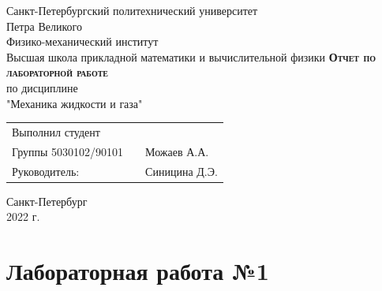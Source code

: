 \documentclass[12pt, a4paper]{article}
\begin{document}
\begin{titlepage}
\begin{center}

\large
Санкт-Петербургский политехнический университет\\Петра Великого\\
\vspace{0.5cm}
Физико-механический институт\\
\vspace{0.25cm}
Высшая школа прикладной математики и вычислительной физики
\vfill
\textsc{\large\textbf{Отчет по лабораторной работе}}\\[2cm]
\large
по дисциплине\\"Механика жидкости и газа"
\end{center}
\vfill
\begin{tabular}{l p{} l}
            Выполнил студент\\Группы 5030102/90101 && Можаев А.А.
            \vspace{0.25cm}
            \\Руководитель: && Синицина Д.Э.
        \end{tabular}
        \vfill
        \begin{center}
            Санкт-Петербург\\2022 г.
        \end{center}
\end{titlepage}

\newpage
\begin{center}
    \tableofcontents
    \setcounter{page}{2}
\end{center}

\newpage
\begin{center}
    \listoffigures
\end{center}

\newpage
\begin{center}
    \listoftables
\end{center}

\newpage
\section{Лабораторная работа №1}
\end{document}
